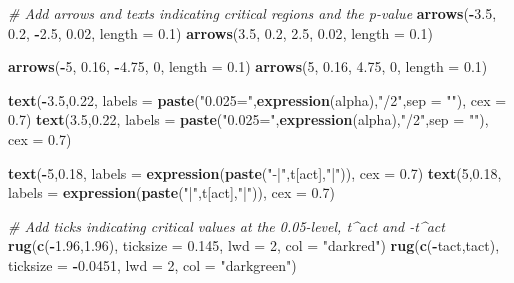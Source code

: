 \documentclass[]{book}
\newenvironment{Shaded}{\begin{snugshade}}{\end{snugshade}}
\newcommand{\KeywordTok}[1]{\textcolor[rgb]{0.13,0.29,0.53}{\textbf{#1}}}
\newcommand{\DataTypeTok}[1]{\textcolor[rgb]{0.13,0.29,0.53}{#1}}
\newcommand{\DecValTok}[1]{\textcolor[rgb]{0.00,0.00,0.81}{#1}}
\newcommand{\FloatTok}[1]{\textcolor[rgb]{0.00,0.00,0.81}{#1}}
\newcommand{\StringTok}[1]{\textcolor[rgb]{0.31,0.60,0.02}{#1}}
\newcommand{\CommentTok}[1]{\textcolor[rgb]{0.56,0.35,0.01}{\textit{#1}}}
\newcommand{\OperatorTok}[1]{\textcolor[rgb]{0.81,0.36,0.00}{\textbf{#1}}}
\newcommand{\NormalTok}[1]{#1}
\theoremstyle{definition}
\theoremstyle{definition}
\theoremstyle{definition}
\theoremstyle{remark}
\begin{document}
\begin{Shaded}
\begin{Highlighting}[]
\CommentTok{# Add arrows and texts indicating critical regions and the p-value}
\KeywordTok{arrows}\NormalTok{(}\OperatorTok{-}\FloatTok{3.5}\NormalTok{, }\FloatTok{0.2}\NormalTok{, }\OperatorTok{-}\FloatTok{2.5}\NormalTok{, }\FloatTok{0.02}\NormalTok{, }\DataTypeTok{length =} \FloatTok{0.1}\NormalTok{)}
\KeywordTok{arrows}\NormalTok{(}\FloatTok{3.5}\NormalTok{, }\FloatTok{0.2}\NormalTok{, }\FloatTok{2.5}\NormalTok{, }\FloatTok{0.02}\NormalTok{, }\DataTypeTok{length =} \FloatTok{0.1}\NormalTok{)}

\KeywordTok{arrows}\NormalTok{(}\OperatorTok{-}\DecValTok{5}\NormalTok{, }\FloatTok{0.16}\NormalTok{, }\OperatorTok{-}\FloatTok{4.75}\NormalTok{, }\DecValTok{0}\NormalTok{, }\DataTypeTok{length =} \FloatTok{0.1}\NormalTok{)}
\KeywordTok{arrows}\NormalTok{(}\DecValTok{5}\NormalTok{, }\FloatTok{0.16}\NormalTok{, }\FloatTok{4.75}\NormalTok{, }\DecValTok{0}\NormalTok{, }\DataTypeTok{length =} \FloatTok{0.1}\NormalTok{)}

\KeywordTok{text}\NormalTok{(}\OperatorTok{-}\FloatTok{3.5}\NormalTok{,}\FloatTok{0.22}\NormalTok{, }\DataTypeTok{labels =} \KeywordTok{paste}\NormalTok{(}\StringTok{"0.025="}\NormalTok{,}\KeywordTok{expression}\NormalTok{(alpha),}\StringTok{"/2"}\NormalTok{,}\DataTypeTok{sep =} \StringTok{""}\NormalTok{), }\DataTypeTok{cex =} \FloatTok{0.7}\NormalTok{)}
\KeywordTok{text}\NormalTok{(}\FloatTok{3.5}\NormalTok{,}\FloatTok{0.22}\NormalTok{, }\DataTypeTok{labels =} \KeywordTok{paste}\NormalTok{(}\StringTok{"0.025="}\NormalTok{,}\KeywordTok{expression}\NormalTok{(alpha),}\StringTok{"/2"}\NormalTok{,}\DataTypeTok{sep =} \StringTok{""}\NormalTok{), }\DataTypeTok{cex =} \FloatTok{0.7}\NormalTok{)}

\KeywordTok{text}\NormalTok{(}\OperatorTok{-}\DecValTok{5}\NormalTok{,}\FloatTok{0.18}\NormalTok{, }\DataTypeTok{labels =} \KeywordTok{expression}\NormalTok{(}\KeywordTok{paste}\NormalTok{(}\StringTok{"-|"}\NormalTok{,t[act],}\StringTok{"|"}\NormalTok{)), }\DataTypeTok{cex =} \FloatTok{0.7}\NormalTok{)}
\KeywordTok{text}\NormalTok{(}\DecValTok{5}\NormalTok{,}\FloatTok{0.18}\NormalTok{, }\DataTypeTok{labels =} \KeywordTok{expression}\NormalTok{(}\KeywordTok{paste}\NormalTok{(}\StringTok{"|"}\NormalTok{,t[act],}\StringTok{"|"}\NormalTok{)), }\DataTypeTok{cex =} \FloatTok{0.7}\NormalTok{)}

\CommentTok{# Add ticks indicating critical values at the 0.05-level, t^act and -t^act }
\KeywordTok{rug}\NormalTok{(}\KeywordTok{c}\NormalTok{(}\OperatorTok{-}\FloatTok{1.96}\NormalTok{,}\FloatTok{1.96}\NormalTok{), }\DataTypeTok{ticksize  =} \FloatTok{0.145}\NormalTok{, }\DataTypeTok{lwd =} \DecValTok{2}\NormalTok{, }\DataTypeTok{col =} \StringTok{"darkred"}\NormalTok{)}
\KeywordTok{rug}\NormalTok{(}\KeywordTok{c}\NormalTok{(}\OperatorTok{-}\NormalTok{tact,tact), }\DataTypeTok{ticksize  =} \OperatorTok{-}\FloatTok{0.0451}\NormalTok{, }\DataTypeTok{lwd =} \DecValTok{2}\NormalTok{, }\DataTypeTok{col =} \StringTok{"darkgreen"}\NormalTok{)}
\end{Highlighting}
\end{Shaded}
\end{document}
